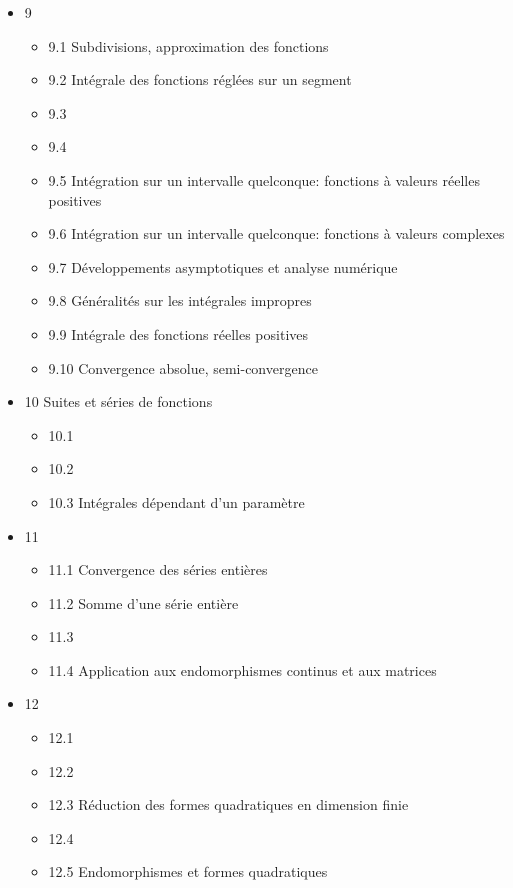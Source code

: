 \documentclass{article}
\begin{document}
\begin{itemize}
\begin{itemize}
    \end{itemize}
  \item 9
    \begin{itemize}
      \item 9.1 Subdivisions, approximation des fonctions
      \item 9.2 Intégrale des fonctions réglées sur un segment
      \item 9.3
      \item 9.4
      \item 9.5 Intégration sur un intervalle quelconque: fonctions à valeurs réelles positives
      \item 9.6 Intégration sur un intervalle quelconque: fonctions à valeurs complexes
      \item 9.7 Développements asymptotiques et analyse numérique
      \item 9.8 Généralités sur les intégrales impropres
      \item 9.9 Intégrale des fonctions réelles positives
      \item 9.10 Convergence absolue, semi-convergence
    \end{itemize}
  \item 10 Suites et séries de fonctions
    \begin{itemize}
      \item 10.1
      \item 10.2
      \item 10.3 Intégrales dépendant d'un paramètre
    \end{itemize}
  \item 11
    \begin{itemize}
      \item 11.1 Convergence des séries entières
      \item 11.2 Somme d'une série entière
      \item 11.3
      \item 11.4 Application aux endomorphismes continus et aux matrices
    \end{itemize}
  \item 12
    \begin{itemize}
      \item 12.1
      \item 12.2
      \item 12.3 Réduction des formes quadratiques en dimension finie
      \item 12.4
      \item 12.5 Endomorphismes et formes quadratiques

\end{itemize}
\end{itemize}
\end{document}
